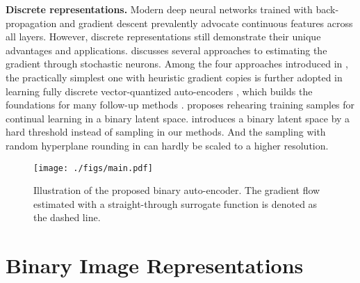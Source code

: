 \documentclass[10pt,twocolumn,letterpaper]{article}
\begin{document}
\noindent \textbf{Discrete representations.}
Modern deep neural networks trained with back-propagation and gradient descent prevalently advocate continuous features across all layers.
However, discrete representations still demonstrate their unique advantages and applications.
\cite{estimating} discusses several approaches to estimating the gradient through stochastic neurons. Among the four approaches introduced in \cite{estimating}, the practically simplest one with heuristic gradient copies is further adopted in learning fully discrete vector-quantized auto-encoders \cite{vqvae}, which builds the foundations for many follow-up methods \cite{unleashing,maskgit,vqgan,vqvae2}. 
\cite{deja2021binplay} proposes rehearing training samples for continual learning in a binary latent space. 
\cite{latentb} introduces a binary latent space by a hard threshold instead of sampling in our methods. And the sampling with random hyperplane rounding in \cite{latent} can hardly be scaled to a higher resolution.



\newcommand{\img}{\textbf{x}}
\newcommand{\latent}{\textbf{y}}
\newcommand{\blatent}{\textbf{z}}
\newcommand{\encoder}{\boldsymbol{\Psi}}
\newcommand{\decoder}{\boldsymbol{\Phi}}
\newcommand{\bnl}{\mathcal{B}}
\newcommand{\R}{\mathbb{R}}



\begin{figure*}[t]
    \centering
	\texttt{[image: ./figs/main.pdf]}
\caption{Illustration of the proposed binary auto-encoder. The gradient flow estimated with a straight-through surrogate function is denoted as the dashed line.}
\label{fig:bae}
\end{figure*}

\section{Binary Image Representations}
\label{bae}
\end{document}
